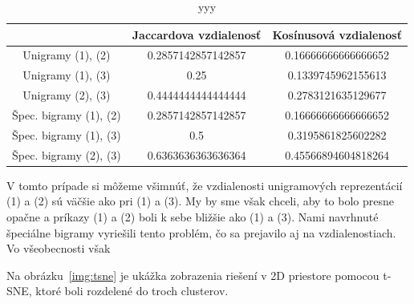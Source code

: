 \begin{table}[h]
	\centering
	\begin{tabular}{|c||c|c|} 
		\hline
		& Jaccardova vzdialenosť
		& Kosínusová vzdialenosť\\
		\hline
		Unigramy (1), (2) & 0.2857142857142857 & 0.16666666666666652\\
		\hline
		Unigramy (1), (3) & 0.25 & 0.1339745962155613\\
		\hline
		Unigramy (2), (3) & 0.4444444444444444 & 0.2783121635129677\\
		\Xhline{2pt}
		Špec. bigramy (1), (2) & 0.2857142857142857 & 0.16666666666666652\\
		\hline
		Špec. bigramy (1), (3) & 0.5 & 0.3195861825602282\\
		\hline
		Špec. bigramy (2), (3) & 0.6363636363636364 & 0.45566894604818264\\
		\hline
	\end{tabular}
	\caption[xxx]{yyy}
	\label{tab:distances2}
\end{table}

V tomto prípade si môžeme všimnúť, že vzdialenosti unigramových reprezentácií
(1) a (2) sú väčšie ako pri (1) a (3). My by sme však chceli, aby to bolo presne opačne
a príkazy (1) a (2) boli k sebe bližšie ako (1) a (3). Nami navrhnuté špeciálne bigramy
vyriešili tento problém, čo sa prejavilo aj na vzdialenostiach.
Vo všeobecnosti však 

Na obrázku~\ref{img:tsne} je ukážka zobrazenia riešení v 2D priestore pomocou
t-SNE, ktoré boli rozdelené do troch clusterov.

